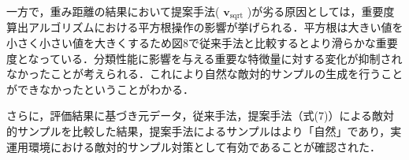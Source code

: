 一方で，重み距離の結果において提案手法( $\bm{v}_{\mathrm{sqrt}}$ )が劣る原因としては，重要度算出アルゴリズムにおける平方根操作の影響が挙げられる．平方根は大きい値を小さく小さい値を大きくするため図8で従来手法と比較するとより滑らかな重要度となっている．分類性能に影響を与える重要な特徴量に対する変化が抑制されなかったことが考えられる．これにより自然な敵対的サンプルの生成を行うことができなかったということがわかる．

さらに，評価結果に基づき元データ，従来手法，提案手法（式(7)）による敵対的サンプルを比較した結果，提案手法によるサンプルはより「自然」であり，実運用環境における敵対的サンプル対策として有効であることが確認された．

